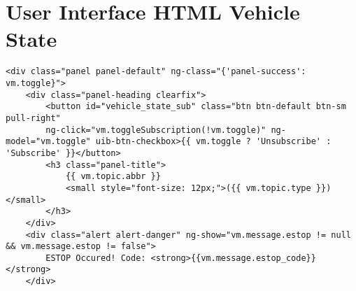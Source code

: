 \section*{User Interface HTML Vehicle State}
\begin{lstlisting}[breaklines=true,basicstyle=\tiny]
<div class="panel panel-default" ng-class="{'panel-success': vm.toggle}">
    <div class="panel-heading clearfix">
        <button id="vehicle_state_sub" class="btn btn-default btn-sm pull-right" 
        ng-click="vm.toggleSubscription(!vm.toggle)" ng-model="vm.toggle" uib-btn-checkbox>{{ vm.toggle ? 'Unsubscribe' : 'Subscribe' }}</button>
        <h3 class="panel-title">
            {{ vm.topic.abbr }}
            <small style="font-size: 12px;">({{ vm.topic.type }})</small>
        </h3>
    </div>
    <div class="alert alert-danger" ng-show="vm.message.estop != null && vm.message.estop != false">
        ESTOP Occured! Code: <strong>{{vm.message.estop_code}}</strong>
    </div>


\end{lstlisting}
